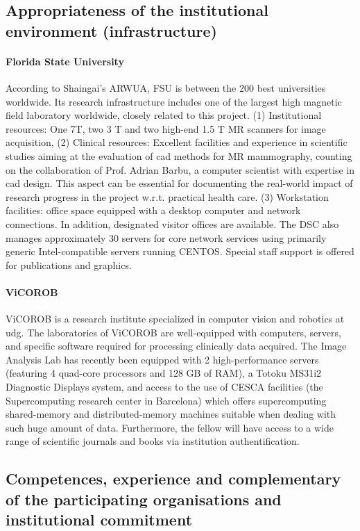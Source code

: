 \subsection{Appropriateness of the institutional environment (infrastructure)}
\label{sec:institution}

\paragraph{Florida State University} 
According to Shaingai's ARWUA, FSU is between the 200 best universities worldwide. 
Its research infrastructure includes one of the largest high magnetic field laboratory worldwide, closely related to this project. 
(1) Institutional resources: One 7T, two 3 T and two high-end 1.5 T MR scanners for image acquisition, (2) Clinical resources: Excellent facilities and experience in scientific studies aiming at the evaluation of \ac{cad} methods for MR mammography, counting on the collaboration of Prof. Adrian Barbu, a computer scientist with expertise in \ac{cad} design. 
This aspect can be essential for documenting the real-world impact of research progress in the project w.r.t. practical health care. 
(3) Workstation facilities: office space equipped with a desktop computer and network connections. 
In addition, designated visitor offices are available. 
The DSC also manages approximately 30 servers for core network services using primarily generic Intel-compatible servers running CENTOS. 
Special staff support is offered for publications and graphics.

\paragraph{ViCOROB}
ViCOROB is a research institute specialized in computer vision and robotics at \ac{udg}.
The laboratories of ViCOROB are well-equipped with computers, servers, and specific software required for processing clinically data acquired. 
The Image Analysis Lab has recently been equipped with 2 high-performance servers (featuring 4 quad-core processors and 128 GB of RAM), a Totoku MS31i2 Diagnostic Displays system, and access to the use of CESCA facilities (the Supercomputing research center in Barcelona) which offers supercomputing shared-memory and distributed-memory machines suitable when dealing with such huge amount of data.
Furthermore, the fellow will have access to a wide range of scientific journals and books via institution authentification.

\subsection{Competences, experience and complementary of the participating organisations and institutional commitment}
\label{sec:competences}


